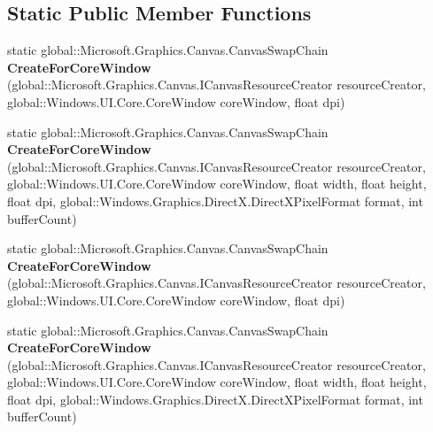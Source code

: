 \subsection*{Static Public Member Functions}
\begin{DoxyCompactItemize}
\item 
\mbox{\label{class_microsoft_1_1_graphics_1_1_canvas_1_1_canvas_swap_chain_a8fa08daf46ee7d57c889792586e27f7c}} 
static global\+::\+Microsoft.\+Graphics.\+Canvas.\+Canvas\+Swap\+Chain {\bfseries Create\+For\+Core\+Window} (global\+::\+Microsoft.\+Graphics.\+Canvas.\+I\+Canvas\+Resource\+Creator resource\+Creator, global\+::\+Windows.\+U\+I.\+Core.\+Core\+Window core\+Window, float dpi)
\item 
\mbox{\label{class_microsoft_1_1_graphics_1_1_canvas_1_1_canvas_swap_chain_ac26b19a1cacc3024720abd11fbc18999}} 
static global\+::\+Microsoft.\+Graphics.\+Canvas.\+Canvas\+Swap\+Chain {\bfseries Create\+For\+Core\+Window} (global\+::\+Microsoft.\+Graphics.\+Canvas.\+I\+Canvas\+Resource\+Creator resource\+Creator, global\+::\+Windows.\+U\+I.\+Core.\+Core\+Window core\+Window, float width, float height, float dpi, global\+::\+Windows.\+Graphics.\+Direct\+X.\+Direct\+X\+Pixel\+Format format, int buffer\+Count)
\item 
\mbox{\label{class_microsoft_1_1_graphics_1_1_canvas_1_1_canvas_swap_chain_a8fa08daf46ee7d57c889792586e27f7c}} 
static global\+::\+Microsoft.\+Graphics.\+Canvas.\+Canvas\+Swap\+Chain {\bfseries Create\+For\+Core\+Window} (global\+::\+Microsoft.\+Graphics.\+Canvas.\+I\+Canvas\+Resource\+Creator resource\+Creator, global\+::\+Windows.\+U\+I.\+Core.\+Core\+Window core\+Window, float dpi)
\item 
\mbox{\label{class_microsoft_1_1_graphics_1_1_canvas_1_1_canvas_swap_chain_ac26b19a1cacc3024720abd11fbc18999}} 
static global\+::\+Microsoft.\+Graphics.\+Canvas.\+Canvas\+Swap\+Chain {\bfseries Create\+For\+Core\+Window} (global\+::\+Microsoft.\+Graphics.\+Canvas.\+I\+Canvas\+Resource\+Creator resource\+Creator, global\+::\+Windows.\+U\+I.\+Core.\+Core\+Window core\+Window, float width, float height, float dpi, global\+::\+Windows.\+Graphics.\+Direct\+X.\+Direct\+X\+Pixel\+Format format, int buffer\+Count)

\end{DoxyCompactItemize}
